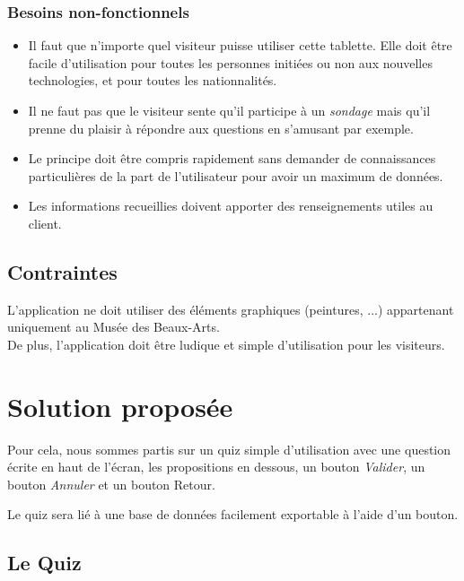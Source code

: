 \documentclass[12]{report}
\begin{document}
  \subsection{Besoins non-fonctionnels}

  \begin{itemize}
    \item Il faut que n'importe quel visiteur puisse utiliser cette tablette.
          Elle doit être facile d'utilisation pour toutes les personnes initiées ou non aux nouvelles technologies, et pour toutes les nationnalités.

    \item Il ne faut pas que le visiteur sente qu'il participe à un \emph{sondage} mais qu'il prenne du plaisir à répondre aux questions en s'amusant par exemple.
    \item Le principe doit être compris rapidement sans demander de connaissances particulières de la part de l'utilisateur pour avoir un maximum de données.
    \item Les informations recueillies doivent apporter des renseignements utiles au client.
  \end{itemize}

  \section{Contraintes}

  L'application ne doit utiliser des éléments graphiques (peintures, ...) appartenant uniquement au Musée des Beaux-Arts. \\

  De plus, l'application doit être ludique et simple d'utilisation pour les visiteurs.

  \chapter{Solution proposée}

  Pour cela, nous sommes partis sur un quiz simple d'utilisation avec une question écrite en haut de l'écran, les propositions en dessous, un bouton \emph{Valider}, un bouton \emph{Annuler} et un bouton {Retour}.

  Le quiz sera lié à une base de données facilement exportable à l'aide d'un bouton.

  \newpage
  \section{Le Quiz}
\end{document}
